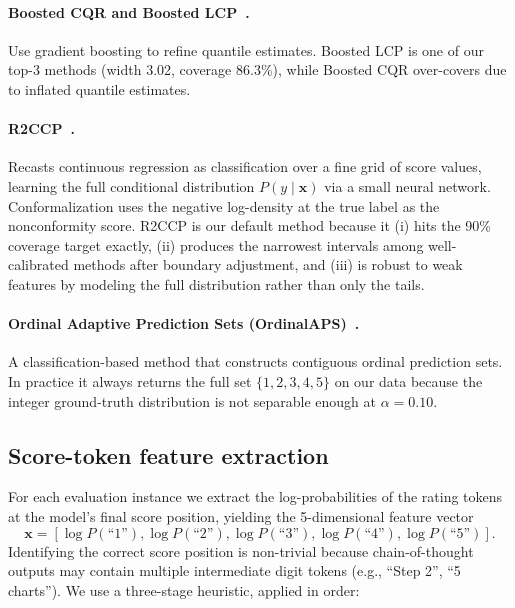 \documentclass{article}
\begin{document}
\paragraph{Boosted CQR and Boosted LCP~\citep{xie2024boosted}.}
Use gradient boosting to refine quantile estimates. Boosted LCP is one of our top-3 methods (width 3.02, coverage 86.3\%), while Boosted CQR over-covers due to inflated quantile estimates.

\paragraph{R2CCP~\citep{guha2024conformal}.}
Recasts continuous regression as classification over a fine grid of score values, learning the full conditional distribution $P(y \mid \mathbf{x})$ via a small neural network. Conformalization uses the negative log-density at the true label as the nonconformity score. R2CCP is our default method because it (i) hits the 90\% coverage target exactly, (ii) produces the narrowest intervals among well-calibrated methods after boundary adjustment, and (iii) is robust to weak features by modeling the full distribution rather than only the tails.

\paragraph{Ordinal Adaptive Prediction Sets (OrdinalAPS)~\citep{lu2022fair}.}
A classification-based method that constructs contiguous ordinal prediction sets. In practice it always returns the full set $\{1,2,3,4,5\}$ on our data because the integer ground-truth distribution is not separable enough at $\alpha = 0.10$.

\subsection{Score-token feature extraction}
\label{app:feature_extraction}

For each evaluation instance we extract the log-probabilities of the rating tokens at the model's final score position, yielding the 5-dimensional feature vector
\[
\mathbf{x} = [\log P(\text{``1''}), \log P(\text{``2''}), \log P(\text{``3''}), \log P(\text{``4''}), \log P(\text{``5''})].
\]
Identifying the correct score position is non-trivial because chain-of-thought outputs may contain multiple intermediate digit tokens (e.g., ``Step 2'', ``5 charts''). We use a three-stage heuristic, applied in order:
\end{document}
